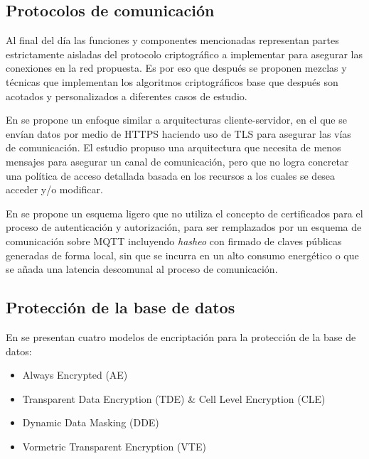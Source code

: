 \documentclass{article}
\begin{document}
        \subsection{Protocolos de comunicación}

            Al final del día las funciones y componentes mencionadas representan partes estrictamente aisladas del protocolo criptográfico a implementar para asegurar las conexiones en la red propuesta. Es por eso que después se proponen mezclas y técnicas que implementan los algoritmos criptográficos base que después son acotados y personalizados a diferentes casos de estudio.

            En \cite{abreu2020identity} se propone un enfoque similar a arquitecturas cliente-servidor, en el que se envían datos por medio de HTTPS haciendo uso de TLS para asegurar las vías de comunicación. El estudio propuso una arquitectura que necesita de menos mensajes para asegurar un canal de comunicación, pero que no logra concretar una política de acceso  detallada basada en los recursos a los cuales se desea acceder y/o modificar.

            En \cite{lohachab2019ecc} se propone un esquema ligero que no utiliza el concepto de certificados para el proceso de autenticación y autorización, para ser remplazados por un esquema de comunicación sobre MQTT incluyendo \textit{hasheo} con firmado de claves públicas generadas de forma local, sin que se incurra en un alto consumo energético o que se añada una latencia descomunal al proceso de comunicación.

        \subsection{Protección de la base de datos}

            En \cite{mukherjee2019popular} se presentan cuatro modelos de encriptación para la protección de la base de datos:
            \begin{itemize}[noitemsep, leftmargin=*]
                \item Always Encrypted (AE)
                \item Transparent Data Encryption (TDE) \& Cell Level Encryption (CLE)
                \item Dynamic Data Masking (DDE)
                \item Vormetric Transparent Encryption (VTE)
            \end{itemize}
\end{document}
